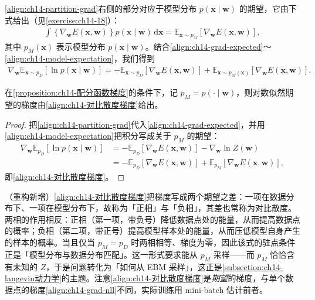 \documentclass[../../main.tex]{subfiles}
\begin{document}
\eqref{align:ch14-partition-grad}右侧的部分对应于模型分布 $p(\bm{x}\mid\bm{w})$ 的期望，它由下式给出（见\cref{exercise:ch14-18}）：
\begin{align}
\int\left\{\nabla_{\bm{w}}E(\bm{x},\bm{w})\right\}p(\bm{x}\mid\bm{w})\,\mathrm{d}\bm{x}=\mathbb{E}_{\bm{x}\sim p_{M}}\left[\nabla_{\bm{w}}E(\bm{x},\bm{w})\right],
\label{align:ch14-model-expectation}
\end{align}
其中 $p_{M}(\bm{x})$ 表示模型分布 $p(\bm{x}\mid\bm{w})$。结合\eqref{align:ch14-grad-expected}～\eqref{align:ch14-model-expectation}，我们得到
\begin{align}
\nabla_{\bm{w}}\mathbb{E}_{\bm{x}\sim p_{D}}\left[\ln p(\bm{x}\mid\bm{w})\right]=-\mathbb{E}_{\bm{x}\sim p_{D}}\left[\nabla_{\bm{w}}E(\bm{x},\bm{w})\right]+\mathbb{E}_{\bm{x}\sim p_{M}(\bm{x})}\left[\nabla_{\bm{w}}E(\bm{x},\bm{w})\right].
\label{align:ch14-对比散度梯度}
\end{align}

\begin{theorem}[对比散度梯度]\label{theorem:ch14-对比散度梯度}
在\cref{proposition:ch14-配分函数梯度}的条件下，记 $p_{M}=p(\cdot\mid\bm{w})$，则对数似然期望的梯度由\eqref{align:ch14-对比散度梯度}给出。
\end{theorem}

\begin{proof}
把\eqref{align:ch14-partition-grad}代入\eqref{align:ch14-grad-expected}，并用\eqref{align:ch14-model-expectation}把积分写成关于 $p_{M}$ 的期望：
\begin{align*}
\nabla_{\bm{w}}\mathbb{E}_{p_{D}}\left[\ln p(\bm{x}\mid\bm{w})\right]&=-\mathbb{E}_{p_{D}}\left[\nabla_{\bm{w}}E(\bm{x},\bm{w})\right]-\nabla_{\bm{w}}\ln Z(\bm{w})\\
&=-\mathbb{E}_{p_{D}}\left[\nabla_{\bm{w}}E(\bm{x},\bm{w})\right]+\mathbb{E}_{p_{M}}\left[\nabla_{\bm{w}}E(\bm{x},\bm{w})\right],
\end{align*}
即\eqref{align:ch14-对比散度梯度}。
\end{proof}

\begin{remark}（重构新增）\eqref{align:ch14-对比散度梯度}把梯度写成两个期望之差：一项在数据分布下、一项在模型分布下，故称为「正相」与「负相」，其差也常称为对比散度。两相的作用相反：正相（第一项，带负号）降低数据点处的能量，从而提高数据点的概率；负相（第二项，带正号）提高模型样本处的能量，从而压低模型自身产生的样本的概率。当且仅当 $p_{M}=p_{D}$ 时两相相等、梯度为零，因此该式的驻点条件正是「模型分布与数据分布匹配」。这一形式要求能从 $p_{M}$ 采样——而 $p_{M}$ 恰恰含有未知的 $Z$，于是问题转化为「如何从 EBM 采样」，这正是\cref{subsection:ch14-langevin动力学}的主题。注意\eqref{align:ch14-对比散度梯度}是\emph{期望}的梯度，与单个数据点的梯度\eqref{align:ch14-grad-nll}不同，实际训练用 mini-batch 估计前者。
\end{remark}
\end{document}
